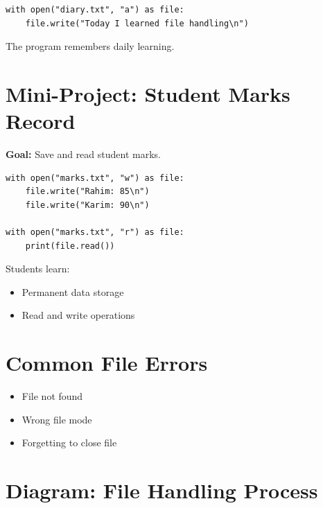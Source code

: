 \begin{verbatim}
with open("diary.txt", "a") as file:
    file.write("Today I learned file handling\n")
\end{verbatim}

The program remembers daily learning.

\section{Mini-Project: Student Marks Record}

\textbf{Goal:} Save and read student marks.

\begin{verbatim}
with open("marks.txt", "w") as file:
    file.write("Rahim: 85\n")
    file.write("Karim: 90\n")

with open("marks.txt", "r") as file:
    print(file.read())
\end{verbatim}

Students learn:
\begin{itemize}
    \item Permanent data storage
    \item Read and write operations
\end{itemize}

\section{Common File Errors}

\begin{itemize}
    \item File not found
    \item Wrong file mode
    \item Forgetting to close file
\end{itemize}

\section{Diagram: File Handling Process}

\begin{center}
\end{center}

